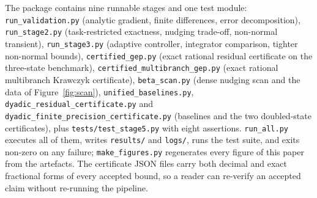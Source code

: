 \documentclass[11pt]{article}
\theoremstyle{definition}
\theoremstyle{remark}
\begin{document}
The package contains nine runnable stages and one test module:
\texttt{run\_validation.py} (analytic gradient, finite differences, error decomposition),
\texttt{run\_stage2.py} (task-restricted exactness, nudging trade-off, non-normal transient),
\texttt{run\_stage3.py} (adaptive controller, integrator comparison, tighter non-normal bounds),
\texttt{certified\_gep.py} (exact rational residual certificate on the three-state benchmark),
\texttt{certified\_multibranch\_gep.py} (exact rational multibranch Krawczyk certificate),
\texttt{beta\_scan.py} (dense nudging scan and the data of Figure~\ref{fig:scan}),
\texttt{unified\_baselines.py}, \texttt{dyadic\_residual\_certificate.py} and
\texttt{dyadic\_finite\_precision\_certificate.py} (baselines and the two doubled-state
certificates), plus \texttt{tests/test\_stage5.py} with eight assertions.
\texttt{run\_all.py} executes all of them, writes \texttt{results/} and \texttt{logs/}, runs the
test suite, and exits non-zero on any failure; \texttt{make\_figures.py} regenerates every figure
of this paper from the artefacts. The certificate JSON files carry both decimal and exact
fractional forms of every accepted bound, so a reader can re-verify an accepted claim without
re-running the pipeline.
\end{document}
